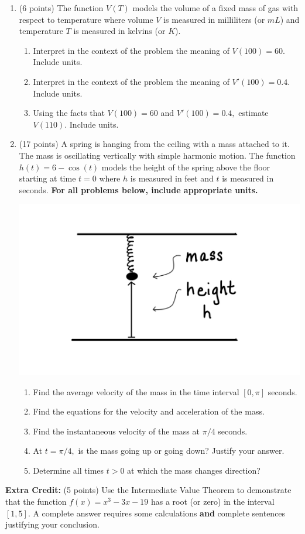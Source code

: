 \documentclass[12pt]{article}
\renewcommand{\emph}[1]{\textsf{\textbf{#1}}}
\begin{document}
\begin{enumerate}
\item (6 points) The function $V(T)$ models the volume of a fixed mass of gas with respect to temperature where volume $V$ is measured in milliliters (or $mL$) and temperature $T$ is measured in kelvins (or $K$).
	\begin{enumerate}
	\item Interpret in the context of the problem the meaning of $V(100)=60.$ Include units.
	\vfill
	\item Interpret in the context of the problem the meaning of $V'(100)=0.4.$ Include units.
	\vfill
	\item Using the facts that $V(100)=60$ and $V'(100)=0.4,$ estimate $V(110).$ Include units.
	\vfill
	\end{enumerate}
\newpage
\item (17 points) A spring is hanging from the ceiling with a mass attached to it. The mass is oscillating vertically with simple harmonic motion. The function $h(t)= 6-\cos(t)$ models the height of the spring above the floor starting at time $t=0$ where $h$ is measured in feet and $t$ is measured in seconds.
\emph{For all problems below, include appropriate units.}

\includegraphics[scale=0.2]{spring.jpeg}

\vspace*{-.5in}

	\begin{enumerate}
	\item Find the average velocity of the mass in the time interval $[0, \pi]$ seconds.
	\vfill
	\item Find the equations for the velocity and acceleration of the mass.\\
	\vfill
	\item Find the instantaneous velocity of the mass at $\pi/4$ seconds.\\
	\vfill
	\item At $t=\pi/4,$ is the mass going up or going down? Justify your answer.\\
	\vfill
	\item Determine all times $t>0$ at which the mass changes direction?
	\vfill
	\end{enumerate}
\end{enumerate}
\newpage
\textbf{Extra Credit:} (5 points) Use the Intermediate Value Theorem to demonstrate that the function $f(x)=x^3-3x-19$ has a root (or zero) in the interval $[1,5].$  A complete answer requires some calculations \emph{and} complete sentences justifying your conclusion.
\vspace{2.5in}
\end{document}
